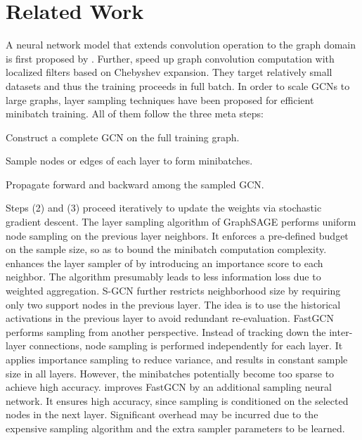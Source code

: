 \section{Related Work}



A neural network model that extends convolution operation to the graph domain is first proposed by \cite{gcn_lecun}. %
Further, \cite{gcn, gcn_nips16} speed up graph convolution computation with localized filters based on Chebyshev expansion. They target relatively small datasets and thus the training proceeds in full batch. In order to scale GCNs to large graphs, layer sampling techniques \citep{graphsage,fastgcn,gcn_web,s-gcn,lgcn,as-gcn} have been proposed for efficient minibatch training. All of them follow the three meta steps: 
\begin{enumerate*}
\item Construct a complete GCN on the full training graph. 
\item Sample nodes or edges of each layer to form minibatches. 
\item Propagate forward and backward among the sampled GCN. 
\end{enumerate*}
Steps (2) and (3) proceed iteratively to update the weights via stochastic gradient descent. 
The layer sampling algorithm of GraphSAGE \citep{graphsage} performs uniform node sampling on the previous layer neighbors. It enforces a pre-defined budget on the sample size, so as to bound the minibatch computation complexity. 
\cite{gcn_web} enhances the layer sampler of \cite{graphsage} by introducing an importance score to each neighbor. The algorithm presumably leads to less information loss due to weighted aggregation. 
S-GCN \citep{s-gcn}  further restricts neighborhood size by requiring only two support nodes in the previous layer. The idea is to use the historical activations in the previous layer to avoid redundant re-evaluation. 
FastGCN \citep{fastgcn} performs sampling from another perspective. Instead of tracking down the inter-layer connections, node sampling is performed independently for each layer. It applies importance sampling to reduce variance, and results in constant sample size in all layers. However, the minibatches potentially become too sparse to achieve high accuracy. \cite{as-gcn} improves FastGCN by an additional sampling neural network. It ensures high accuracy, since sampling is conditioned on the selected nodes in the next layer. Significant overhead may be incurred due to the expensive sampling algorithm and the extra sampler parameters to be learned. 

